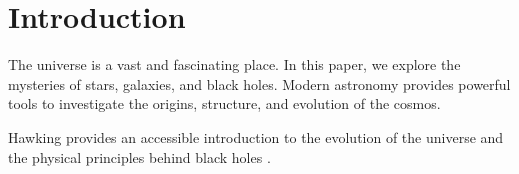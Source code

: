 \section{Introduction}
The universe is a vast and fascinating place. In this paper, we explore the mysteries of stars, galaxies, and black holes. Modern astronomy provides powerful tools to investigate the origins, structure, and evolution of the cosmos.

Hawking provides an accessible introduction to the evolution of the universe and the physical principles behind black holes \parencite{hawking1988}.